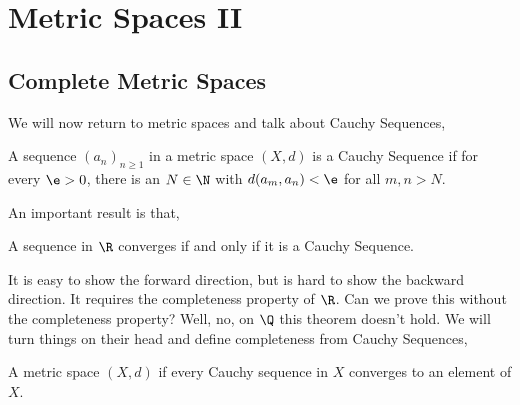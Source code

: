 \section{Metric Spaces II}
\subsection{Complete Metric Spaces}
We will now return to metric spaces and talk about Cauchy Sequences,
\begin{ndefi}
  A sequence $(a_n)_{n \ge 1}$ in a metric space $(X, d)$ is a Cauchy Sequence if for every $\e > 0$, there is an $N \in \N$ with $d(a_m, a_n) < \e$ for all $m,n > N$.
\end{ndefi}

\noindent
An important result is that,
\begin{nthm}[]
  A sequence in $\R$ converges if and only if it is a Cauchy Sequence.
\end{nthm}
\noindent
It is easy to show the forward direction, but is hard to show the backward direction. It requires the completeness property of $\R$. Can we prove this without the completeness property? Well, no, on $\Q$ this theorem doesn't hold. We will turn things on their head and define completeness from Cauchy Sequences,
\begin{ndefi}
  A metric space $(X, d)$ if every Cauchy sequence in $X$ converges to an element of $X$.
\end{ndefi}

